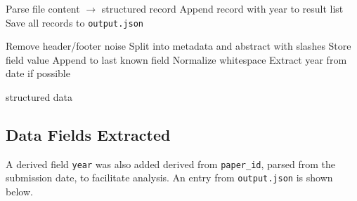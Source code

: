 \documentclass[12pt]{article}
\begin{document}
\begin{algorithmic}[1]
            \State Parse file content $\rightarrow$ structured record
            \State Append record with year to result list
        \EndFor
    \EndFor
    \State Save all records to \texttt{output.json}
\end{algorithmic}

\vspace{1em}

\begin{algorithmic}[1]

    \State Remove header/footer noise
    \State Split into metadata and abstract with slashes
            \State Store field value
        \Else
            \State Append to last known field
        \EndIf
    \EndFor
    \State Normalize whitespace
    \State Extract year from date if possible
    
    \Return structured data
\end{algorithmic}

\subsection{Data Fields Extracted}


A derived field \texttt{year} was also added derived from \texttt{paper\_id}, parsed from the submission date, to facilitate analysis. An entry from \texttt{output.json} is shown below.
\end{document}
